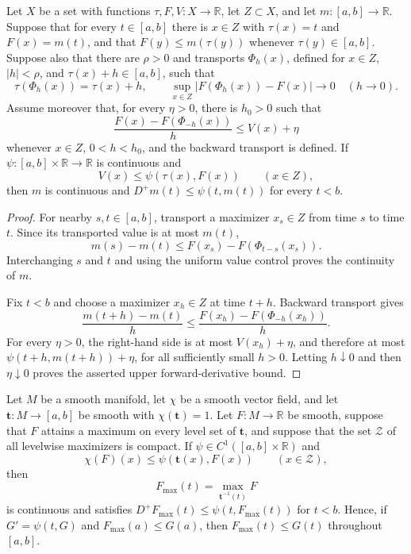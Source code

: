\begin{lemma}
\label{lem:uniform-time-slice-transport}
\notready
Let $X$ be a set with functions $\tau,F,V\colon X\to\mathbb R$, let
$Z\subset X$, and let $m\colon[a,b]\to\mathbb R$.  Suppose that for every
$t\in[a,b]$ there is $x\in Z$ with $\tau(x)=t$ and $F(x)=m(t)$, and that
$F(y)\le m(\tau(y))$ whenever $\tau(y)\in[a,b]$.  Suppose also that there
are $\rho>0$ and transports $\Phi_h(x)$, defined for $x\in Z$,
$|h|<\rho$, and $\tau(x)+h\in[a,b]$, such that
\[
 \tau(\Phi_h(x))=\tau(x)+h,
 \qquad
 \sup_{x\in Z}|F(\Phi_h(x))-F(x)|\longrightarrow0
 \quad(h\to0).
\]
Assume moreover that, for every $\eta>0$, there is $h_0>0$ such that
\[
 \frac{F(x)-F(\Phi_{-h}(x))}{h}\le V(x)+\eta
\]
whenever $x\in Z$, $0<h<h_0$, and the backward transport is defined.
If $\psi\colon[a,b]\times\mathbb R\to\mathbb R$ is continuous and
\[
 V(x)\le\psi(\tau(x),F(x))\qquad(x\in Z),
\]
then $m$ is continuous and $D^+m(t)\le\psi(t,m(t))$ for every $t<b$.
\end{lemma}

\begin{proof}
For nearby $s,t\in[a,b]$, transport a maximizer $x_s\in Z$ from time $s$
to time $t$.  Since its transported value is at most $m(t)$,
\[
 m(s)-m(t)\le F(x_s)-F(\Phi_{t-s}(x_s)).
\]
Interchanging $s$ and $t$ and using the uniform value control proves the
continuity of $m$.

Fix $t<b$ and choose a maximizer $x_h\in Z$ at time $t+h$.  Backward
transport gives
\[
 \frac{m(t+h)-m(t)}h
 \le \frac{F(x_h)-F(\Phi_{-h}(x_h))}{h}.
\]
For every $\eta>0$, the right-hand side is at most
$V(x_h)+\eta$, and therefore at most
$\psi(t+h,m(t+h))+\eta$, for all sufficiently small $h>0$.
Letting $h\downarrow0$ and then $\eta\downarrow0$ proves the asserted
upper forward-derivative bound.
\end{proof}

\begin{theorem}
\label{thm:time-slice-maximum-comparison}
\notready
Let $M$ be a smooth manifold, let $\chi$ be a smooth vector field, and let
$\mathbf t\colon M\to[a,b]$ be smooth with $\chi(\mathbf t)=1$.  Let
$F\colon M\to\mathbb R$ be smooth, suppose that $F$ attains a maximum on
every level set of $\mathbf t$, and suppose that the set $\mathcal Z$ of all
levelwise maximizers is compact.  If
$\psi\in C^1([a,b]\times\mathbb R)$ and
\[
 \chi(F)(x)\le\psi(\mathbf t(x),F(x))
 \qquad(x\in\mathcal Z),
\]
then
\[
 F_{\max}(t)=\max_{\mathbf t^{-1}(t)}F
\]
is continuous and satisfies
$D^+F_{\max}(t)\le\psi(t,F_{\max}(t))$ for $t<b$.  Hence, if
$G'=\psi(t,G)$ and $F_{\max}(a)\le G(a)$, then
$F_{\max}(t)\le G(t)$ throughout $[a,b]$.
\end{theorem}

